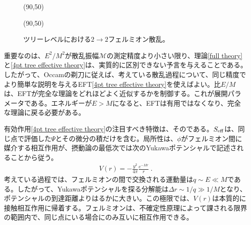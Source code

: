 %
\begin{figure}
	\begin{center}
	\begin{fmfgraph*}(90,50) 
	  
	  
	\fmffreeze
	\end{fmfgraph*}
	\hspace{2.5cm}
	\begin{fmfgraph*}(90,50) 
	  
	  
	\fmffreeze
	\end{fmfgraph*}
	\vspace{.3cm}
\caption{\small ツリーレベルにおける$2 \to 2$フェルミオン散乱。}
		\label{fig fermion scattering full}
		\end{center}
\end{figure}
%


重要なのは、$E^2/M^2$が散乱振幅$\mathcal M$の測定精度より小さい限り、理論\eqref{full theory}と\eqref{4pt tree effective theory}は、実質的に区別できない予言を与えることである。したがって、Occamの剃刀に従えば、考えている散乱過程について、同じ精度でより簡単な説明を与えるEFT\eqref{4pt tree effective theory}を使えばよい。比$E/M$は、EFTが完全な理論をどれほどよく近似するかを制御する。これが展開パラメータである。エネルギーが$E > M$になると、EFTは有用ではなくなり、完全な理論に戻る必要がある。

有効作用\eqref{4pt tree effective theory}の注目すべき特徴は、そのである。$S_{\rm eff}$は、同じ点で評価した$\Psi$とその微分の積だけを含む。局所性は、$\phi$がフェルミオン間に媒介する相互作用が、摂動論の最低次では次のYukawaポテンシャルで記述されることから従う。
%
\begin{align}
	V(r) = - \frac{y^2}{4 \pi} \frac{e^{-M r}}{r} \ .
\end{align}
%
考えている過程では、フェルミオンの間で交換される運動量は$q \sim E \ll M$である。したがって、Yukawaポテンシャルを探る分解能は$ \Delta r \sim 1/q \gg 1/M$となり、ポテンシャルの到達距離よりはるかに大きい。この極限では、$V(r)$は本質的に接触相互作用に帰着する。フェルミオンは、不確定性原理によって課される限界の範囲内で、同じ点にいる場合にのみ互いに相互作用できる。







